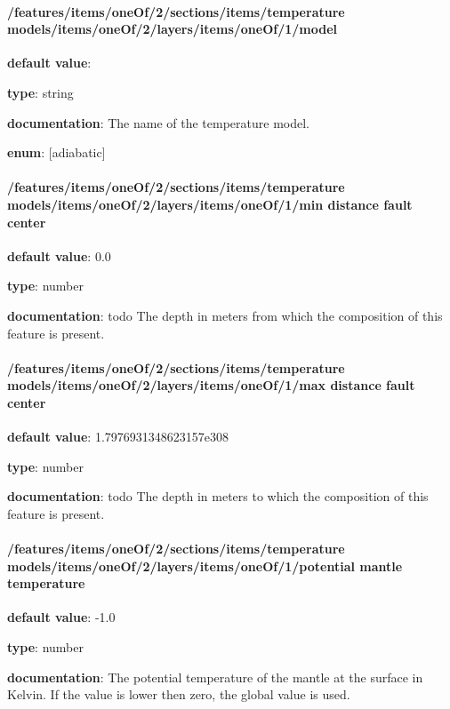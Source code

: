 \paragraph{/features/items/oneOf/2/sections/items/temperature models/items/oneOf/2/layers/items/oneOf/1/model} \begin{itemized}
\item {\bf default value}: 
\item {\bf type}: string
\item {\bf documentation}: The name of the temperature model.
\item {\bf enum}: [adiabatic]\end{itemized}\paragraph{/features/items/oneOf/2/sections/items/temperature models/items/oneOf/2/layers/items/oneOf/1/min distance fault center} \begin{itemized}
\item {\bf default value}: 0.0
\item {\bf type}: number
\item {\bf documentation}: todo The depth in meters from which the composition of this feature is present.
\end{itemized}\paragraph{/features/items/oneOf/2/sections/items/temperature models/items/oneOf/2/layers/items/oneOf/1/max distance fault center} \begin{itemized}
\item {\bf default value}: 1.7976931348623157e308
\item {\bf type}: number
\item {\bf documentation}: todo The depth in meters to which the composition of this feature is present.
\end{itemized}\paragraph{/features/items/oneOf/2/sections/items/temperature models/items/oneOf/2/layers/items/oneOf/1/potential mantle temperature} \begin{itemized}
\item {\bf default value}: -1.0
\item {\bf type}: number
\item {\bf documentation}: The potential temperature of the mantle at the surface in Kelvin. If the value is lower then zero, the global value is used.

\end{itemized}
